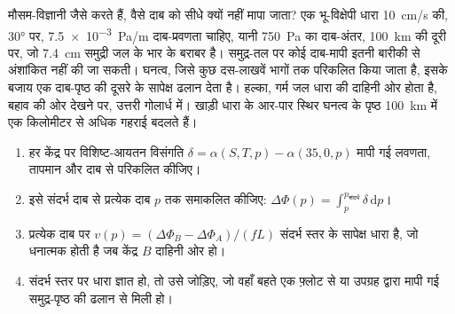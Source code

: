 मौसम-विज्ञानी जैसे करते हैं, वैसे दाब को सीधे क्यों नहीं मापा जाता? एक भू-विक्षेपी
धारा \qty{10}{cm/s} की, \ang{30} पर,
\qty{7.5e-3}{Pa/m} दाब-प्रवणता चाहिए, यानी \qty{750}{Pa} का दाब-अंतर, \qty{100}{km} की दूरी पर,
जो \qty{7.4}{cm} समुद्री जल के भार के बराबर है। समुद्र-तल पर कोई दाब-मापी
इतनी बारीकी से अंशांकित नहीं की जा सकती। घनत्व, जिसे कुछ दस-लाखवें भागों तक परिकलित किया जाता है,
इसके बजाय एक दाब-पृष्ठ की दूसरे के सापेक्ष ढलान देता है। हल्का, गर्म जल
धारा की दाहिनी ओर होता है, बहाव की ओर देखने पर,
उत्तरी गोलार्ध में। खाड़ी धारा के आर-पार स्थिर घनत्व के
पृष्ठ \qty{100}{km} में एक किलोमीटर से अधिक गहराई बदलते हैं।

\begin{method}[दो केंद्रों से भू-विक्षेपी धारा]\label{met:b3:ocean-dynamics:dynamic}
\begin{enumerate}
\item हर केंद्र पर विशिष्ट-आयतन विसंगति $\delta =
  \alpha(S, T, p) - \alpha(35, 0, p)$ मापी गई लवणता,
  तापमान और दाब से परिकलित कीजिए।
\item इसे संदर्भ दाब से प्रत्येक दाब $p$ तक समाकलित कीजिए:
  $\Delta\Phi(p) = \int_p^{p_{\text{संदर्भ}}}\delta\,\mathrm dp$।
\item प्रत्येक दाब पर $v(p) = (\Delta\Phi_B - \Delta\Phi_A)/(fL)$ संदर्भ स्तर के सापेक्ष
  धारा है, जो धनात्मक होती है जब
  केंद्र $B$ दाहिनी ओर हो।
\item संदर्भ स्तर पर धारा ज्ञात हो, तो उसे जोड़िए, जो वहाँ बहते एक फ़्लोट से
  या उपग्रह द्वारा मापी गई समुद्र-पृष्ठ की ढलान से मिली हो।
\end{enumerate}
\end{method}

